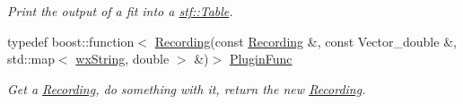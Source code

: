 \begin{DoxyCompactItemize}
\begin{DoxyCompactList}\small\item\em Print the output of a fit into a \hyperlink{classstf_1_1Table}{stf::Table}. \item\end{DoxyCompactList}\item 
\hypertarget{group__stfgen_gaa37601710b061d50b53ceeab1e7a9dd2}{
typedef boost::function$<$ \hyperlink{classRecording}{Recording}(const \hyperlink{classRecording}{Recording} \&, const Vector\_\-double \&, std::map$<$ \hyperlink{classwxString}{wxString}, double $>$ \&)$>$ \hyperlink{group__stfgen_gaa37601710b061d50b53ceeab1e7a9dd2}{PluginFunc}}
\label{group__stfgen_gaa37601710b061d50b53ceeab1e7a9dd2}

\begin{DoxyCompactList}\small\item\em Get a \hyperlink{classRecording}{Recording}, do something with it, return the new \hyperlink{classRecording}{Recording}. \item\end{DoxyCompactList}\end{DoxyCompactItemize}
